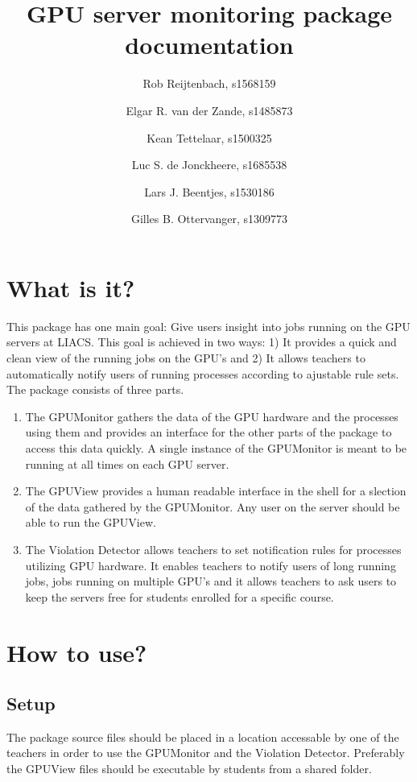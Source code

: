 \documentclass[10pt]{article}
\title{GPU server monitoring package documentation}
\author{
Rob Reijtenbach, s1568159 \and 
Elgar R. van der Zande, s1485873 \and
Kean Tettelaar, s1500325 \and 
Luc S. de Jonckheere, s1685538 \and 
Lars J. Beentjes, s1530186 \and 
Gilles B. Ottervanger, s1309773
}
\begin{document}

\maketitle

\section{What is it?}

This package has one main goal: Give users insight into jobs running 
on the GPU servers at LIACS. This goal is achieved in two ways: 1) 
It provides a quick and clean view of the running jobs on the GPU's
and 2) It allows teachers to automatically notify users of running
processes according to ajustable rule sets.\\

The package consists of three parts.
\begin{enumerate}
\item{} The GPUMonitor gathers the data of the GPU hardware and the processes 
using them and provides an interface for the other parts of the package 
to access this data quickly. A single instance of the GPUMonitor is 
meant to be running at all times on each GPU server.\\

\item{} The GPUView provides a human readable interface in the shell for a 
slection of the data gathered by the GPUMonitor. Any user on the server
should be able to run the GPUView.\\

\item{} The Violation Detector allows teachers to set notification rules for
processes utilizing GPU hardware. It enables teachers to notify users
of long running jobs, jobs running on multiple GPU's and it allows 
teachers to ask users to keep the servers free for students enrolled
for a specific course.
\end{enumerate}

\section{How to use?}
\subsection{Setup}
The package source files should be placed in a location accessable 
by one of the teachers in order to use the GPUMonitor and the 
Violation Detector. Preferably the GPUView files should be executable
by students from a shared folder.
\end{document}
